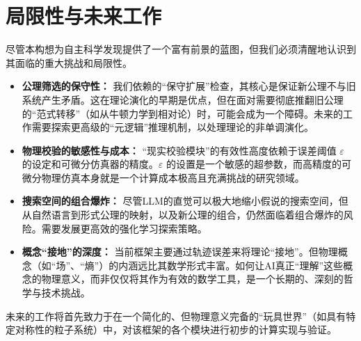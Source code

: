 \documentclass[11pt, a4paper]{article}
\begin{document}
\section{局限性与未来工作}
尽管本构想为自主科学发现提供了一个富有前景的蓝图，但我们必须清醒地认识到其面临的重大挑战和局限性。

\begin{itemize}
	\item \textbf{公理筛选的保守性：} 我们依赖的“保守扩展”检查，其核心是保证新公理不与旧系统产生矛盾。这在理论演化的早期是优点，但在面对需要彻底推翻旧公理的“范式转移”（如从牛顿力学到相对论）时，可能会成为一个障碍。未来的工作需要探索更高级的“元逻辑”推理机制，以处理理论的非单调演化。
	
	\item \textbf{物理校验的敏感性与成本：} “现实校验模块”的有效性高度依赖于误差阈值 $\varepsilon$ 的设定和可微分仿真器的精度。$\varepsilon$ 的设置是一个敏感的超参数，而高精度的可微分物理仿真本身就是一个计算成本极高且充满挑战的研究领域。
	
	\item \textbf{搜索空间的组合爆炸：} 尽管LLM的直觉可以极大地缩小假说的搜索空间，但从自然语言到形式公理的映射，以及新公理的组合，仍然面临着组合爆炸的风险。需要发展更高效的强化学习探索策略。
	
	\item \textbf{概念“接地”的深度：} 当前框架主要通过轨迹误差来将理论“接地”。但物理概念（如“场”、“熵”）的内涵远比其数学形式丰富。如何让AI真正“理解”这些概念的物理意义，而非仅仅将其作为有效的数学工具，是一个长期的、深刻的哲学与技术挑战。
\end{itemize}

未来的工作将首先致力于在一个简化的、但物理意义完备的“玩具世界”（如具有特定对称性的粒子系统）中，对该框架的各个模块进行初步的计算实现与验证。



\end{document}
